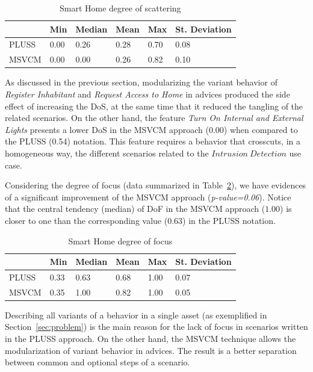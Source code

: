\documentclass{sig-alternate}
\begin{document}
\begin{table}[htb]
\centering
\caption{Smart Home degree of scattering}
\label{tab:sh-dos}
\begin{small}
\begin{tabular}{llllll} \hline
					& Min 	& Median 	& Mean 	& Max 	& St. Deviation \\ \hline 
	PLUSS			& 0.00  & 0.26   	& 0.28  & 0.70 	& 0.08 			\\
	MSVCM	& 0.00  & 0.00  	& 0.26 	& 0.82 & 0.10  		\\ \hline	
\end{tabular}
\end{small}
\end{table}

As discussed in the previous section, modularizing the variant behavior of
\emph{Register Inhabitant} and \emph{Request Access to Home} in advices produced the side effect of increasing the DoS, at the same time that it reduced
the tangling of the related scenarios. On the other hand, the feature \emph{Turn
On Internal and External Lights} presents a lower DoS in the MSVCM approach
(0.00) when compared to the PLUSS (0.54) notation. This feature requires a
behavior that crosscuts, in a homogeneous way, the different scenarios related to
the $Intrusion\ Detection$ use case.


Considering the degree of focus (data summarized in Table~\ref{tab:sh-dof}), we
have evidences of a significant improvement of the MSVCM approach
(\emph{p-value=0.06}). Notice that the central tendency (median) of DoF in the
MSVCM approach ($1.00$) is closer to one than the corresponding value
($0.63$) in the PLUSS notation.

\begin{table}[htb] \centering
\caption{Smart Home degree of focus}
\label{tab:sh-dof}
\begin{small}
\begin{tabular}{llllll} \hline
					& Min 	& Median 	& Mean 	& Max 	& St. Deviation \\ \hline 
	PLUSS			& 0.33  & 0.63   	& 0.68  & 1.00 	& 0.07 			\\
	MSVCM			& 0.35  & 1.00   	& 0.82 	& 1.00 	& 0.05			\\ \hline	
\end{tabular}
\end{small}
\end{table}

Describing all variants of a behavior in a single asset
(as exemplified in Section~\ref{sec:problem}) is the main reason for the lack of
focus in scenarios written in the PLUSS approach. On the other hand, the MSVCM technique
allows the modularization of variant behavior in advices. The result
is a better separation between common and optional steps of a scenario.
\end{document}

